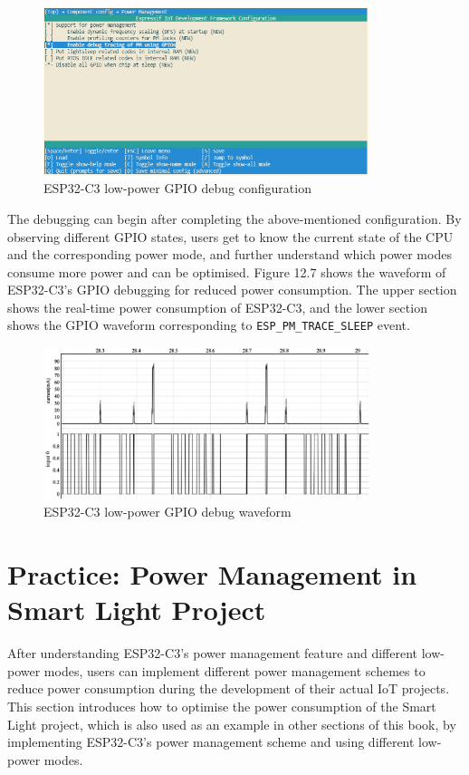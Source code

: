 \documentclass[a4paper,12pt,openany]{book}
\begin{document}
\begin{figure}[!h]
    \centering
    \includegraphics[width=0.85\textwidth]{D12Z/12-6}
    \caption{ESP32-C3 low-power GPIO debug configuration}
\end{figure}

The debugging can begin after completing the above-mentioned configuration. By observing different GPIO states, users get to know the current state of the CPU and the corresponding power mode, and further understand which power modes consume more power and can be optimised. Figure 12.7 shows the waveform of ESP32-C3’s GPIO debugging for reduced power consumption. The upper section shows the real-time power consumption of ESP32-C3, and the lower section shows the GPIO waveform corresponding to \verb|ESP_PM_TRACE_SLEEP| event.

\begin{figure}[!h]
    \centering
    \includegraphics[width=0.85\textwidth]{D12Z/12-7}
    \caption{ESP32-C3 low-power GPIO debug waveform}
\end{figure}

\section{Practice: Power Management in Smart Light Project}
After understanding ESP32-C3’s power management feature and different low-power modes, users can implement different power management schemes to reduce power consumption during the development of their actual IoT projects. This section introduces how to optimise the power consumption of the Smart Light project, which is also used as an example in other sections of this book, by implementing ESP32-C3's power management scheme and using different low-power modes.
\end{document}
